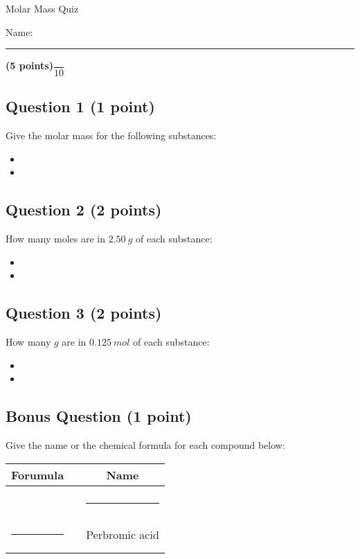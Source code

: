 \documentclass[12pt, letterpaper]{memoir}
\begin{document}
	\begin{center}
		{\large Molar Mass Quiz}
	\end{center}
	{\large Name: \rule[-1mm]{4in}{.1pt} {\bfseries (5 points)}\hspace{4em}$\dfrac{~}{10}$} 
	
	\subsection*{Question 1 (1 point)}
	Give the molar mass for the following substances:
	\begin{itemize}
		\item \vspace{0.5em} 
		\item \vspace{0.75em} 
	\end{itemize}
	
	\vspace{0.5em}
	\subsection*{Question 2 (2 points)}
	How many moles are in $2.50~g$ of each substance:
	\begin{itemize}
		\item \vspace{0.5em} 
		\item \vspace{0.75em} 
	\end{itemize}
	
	
	\vspace{0.5em}
	\subsection*{Question 3 (2 points)}
	How many $g$ are in $0.125~mol$ of each substance:
	\begin{itemize}
		\item \vspace{0.5em} 
		\item \vspace{0.75em} 
	\end{itemize}

	\vspace{0.5em}
	\subsection*{Bonus Question (1 point)}
Give the name or the chemical formula for each compound below:

\begin{tabular}{ccc}
	Forumula && Name \\ \midrule \\
	\ch{H2SO3} && \rule[-1mm]{2in}{.1pt} \\ \\	
	\rule[-1mm]{1in}{.1pt} && Perbromic acid \\ \\
\end{tabular}	
\end{document}
